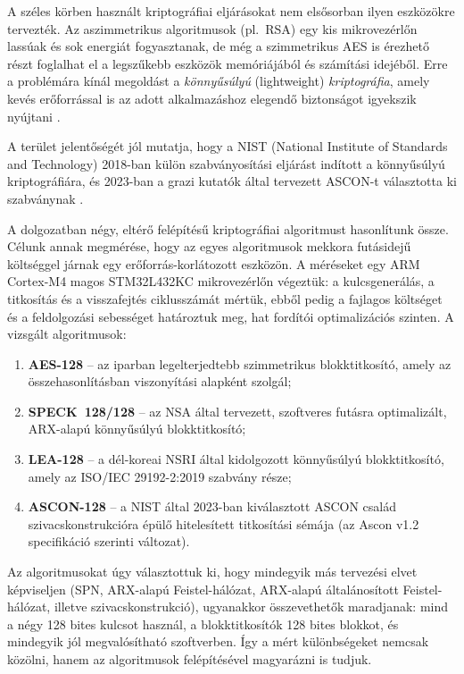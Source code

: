 \documentclass[a4paper,12pt]{report}
\theoremstyle{definition}
\theoremstyle{remark}
\begin{document}
A széles körben használt kriptográfiai eljárásokat nem elsősorban ilyen eszközökre tervezték. Az aszimmetrikus algoritmusok (pl.~RSA) egy kis mikrovezérlőn lassúak és sok energiát fogyasztanak, de még a szimmetrikus AES is érezhető részt foglalhat el a legszűkebb eszközök memóriájából és számítási idejéből. Erre a problémára kínál megoldást a \emph{könnyűsúlyú} (lightweight) \emph{kriptográfia}, amely kevés erőforrással is az adott alkalmazáshoz elegendő biztonságot igyekszik nyújtani \cite{NISTIR8114}.

A terület jelentőségét jól mutatja, hogy a NIST (National Institute of Standards and Technology) 2018-ban külön szabványosítási eljárást indított a könnyűsúlyú kriptográfiára, és 2023-ban a grazi kutatók által tervezett ASCON-t választotta ki szabványnak \cite{NISTLWC2023}.

\bigskip

A dolgozatban négy, eltérő felépítésű kriptográfiai algoritmust hasonlítunk össze. Célunk annak megmérése, hogy az egyes algoritmusok mekkora futásidejű költséggel járnak egy erőforrás-korlátozott eszközön. A méréseket egy ARM Cortex-M4 magos STM32L432KC mikrovezérlőn végeztük: a kulcsgenerálás, a titkosítás és a visszafejtés ciklusszámát mértük, ebből pedig a fajlagos költséget és a feldolgozási sebességet határoztuk meg, hat fordítói optimalizációs szinten. A vizsgált algoritmusok:

\begin{enumerate}
	\item \textbf{AES-128} -- az iparban legelterjedtebb szimmetrikus blokktitkosító, amely az összehasonlításban viszonyítási alapként szolgál;
	\item \textbf{SPECK~128/128} -- az NSA által tervezett, szoftveres futásra optimalizált, ARX-alapú könnyűsúlyú blokktitkosító;
	\item \textbf{LEA-128} -- a dél-koreai NSRI által kidolgozott könnyűsúlyú blokktitkosító, amely az ISO/IEC 29192-2:2019 szabvány része;
	\item \textbf{ASCON-128} -- a NIST által 2023-ban kiválasztott ASCON család szivacskonstrukcióra épülő hitelesített titkosítási sémája (az Ascon v1.2 specifikáció szerinti változat).
\end{enumerate}

Az algoritmusokat úgy választottuk ki, hogy mindegyik más tervezési elvet képviseljen (SPN, ARX-alapú Feistel-hálózat, ARX-alapú általánosított Feistel-hálózat, illetve szivacskonstrukció), ugyanakkor összevethetők maradjanak: mind a négy 128 bites kulcsot használ, a blokktitkosítók 128 bites blokkot, és mindegyik jól megvalósítható szoftverben. Így a mért különbségeket nemcsak közölni, hanem az algoritmusok felépítésével magyarázni is tudjuk.
\end{document}
